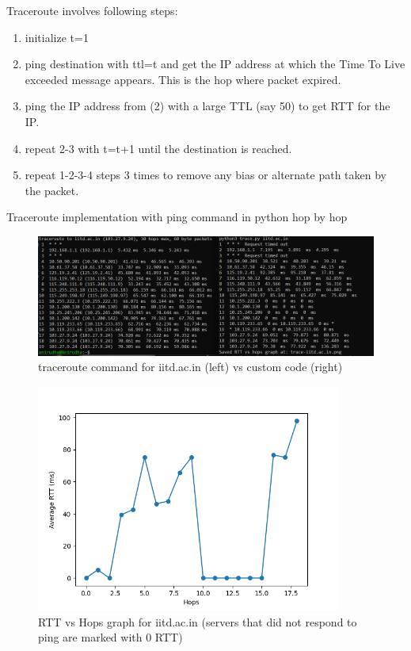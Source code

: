 \documentclass[]{assignment}
\begin{document}
Traceroute involves following steps:

\begin{enumerate}
    \item initialize t=1
    \item ping destination with ttl=t and get the IP address at which the Time To Live exceeded message appears. This is the hop where packet expired.
    \item ping the IP address from (2) with a large TTL (say 50) to get RTT for the IP.
    \item repeat 2-3 with t=t+1 until the destination is reached.
    \item repeat 1-2-3-4 steps 3 times to remove any bias or alternate path taken by the packet.
 \end{enumerate}
    Traceroute implementation with ping command in python hop by hop
        \begin{figure}[hbt!]
    \centering
    \includegraphics[width=18cm]{assignment-1/report/graph.png}
    \caption{traceroute command for iitd.ac.in (left) vs custom code (right)}
    \label{fig:galaxy}
    \end{figure}
        \begin{figure}[hbt!]
    \centering
    \includegraphics[width=10cm]{assignment-1/report/trace-iitd.ac.in.png}
    \caption{RTT vs Hops graph for iitd.ac.in (servers that did not respond to ping are marked with 0 RTT)}
    \label{fig:galaxy}
    \end{figure}
\end{document}
